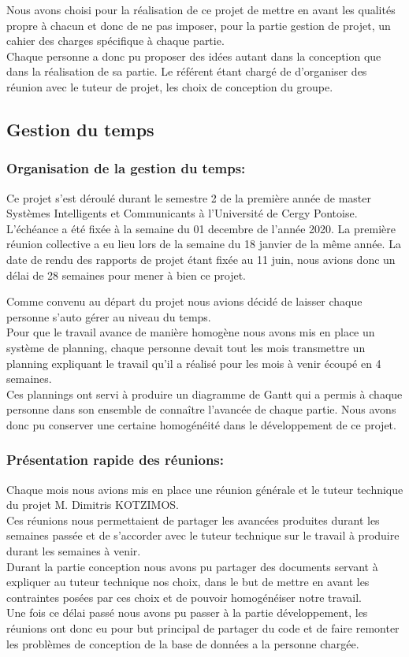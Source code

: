 \documentclass[11pt, report, french]{scrreprt}
\begin{document}
	Nous avons choisi pour la réalisation de ce projet de mettre en avant les qualités propre à chacun et donc de ne pas imposer, pour la partie gestion de projet, un cahier des charges spécifique à chaque partie.\\
	Chaque personne a donc pu proposer des idées autant dans la conception que dans la réalisation de sa partie.
	Le référent étant chargé de d'organiser des réunion avec le tuteur de projet, les choix de conception du groupe.
	\subsection{Gestion du temps}
	\subsubsection{Organisation de la gestion du temps:}
	Ce projet s’est déroulé durant le semestre 2 de la première année de master Systèmes Intelligents et Communicants à l’Université de Cergy Pontoise.\\
	L’échéance a été fixée à la semaine du 01 decembre de l’année 2020. La première réunion collective a eu lieu lors de la semaine du 18 janvier de la même année.
	La date de rendu des rapports de projet étant fixée au 11 juin, nous avions
	donc un délai de 28 semaines pour mener à bien ce projet.\\\par
	Comme convenu au départ du projet nous avions décidé de laisser chaque
	personne s’auto gérer au niveau du temps.\\
	Pour que le travail avance de manière homogène nous avons mis en place
	un système de planning, chaque personne devait tout les mois transmettre un planning expliquant le travail qu'il a réalisé pour les mois à venir écoupé en 4 semaines.\\
	Ces plannings ont servi à produire un diagramme de Gantt qui a permis à chaque personne dans son ensemble de connaître l’avancée de chaque partie.
	Nous avons donc pu conserver une certaine homogénéité dans le développement de ce projet.\\
	
	\subsubsection{Présentation rapide des réunions:}
	Chaque mois nous avions mis en place une réunion générale et le tuteur technique du projet M. Dimitris KOTZIMOS.\\
	Ces réunions nous permettaient de partager les avancées produites durant les
	semaines passée et de s’accorder avec le tuteur technique sur le travail à produire durant les semaines à venir.\\
	Durant la partie conception nous avons pu partager des documents servant à expliquer au  tuteur technique nos choix, dans le but de mettre en avant les contraintes posées par ces choix et de pouvoir homogénéiser notre travail.\\
	Une fois ce délai passé nous avons pu passer à la partie développement, les
	réunions ont donc eu pour but principal de partager du code et de faire remonter les problèmes de conception de la base de données a la personne chargée.\\
\end{document}
